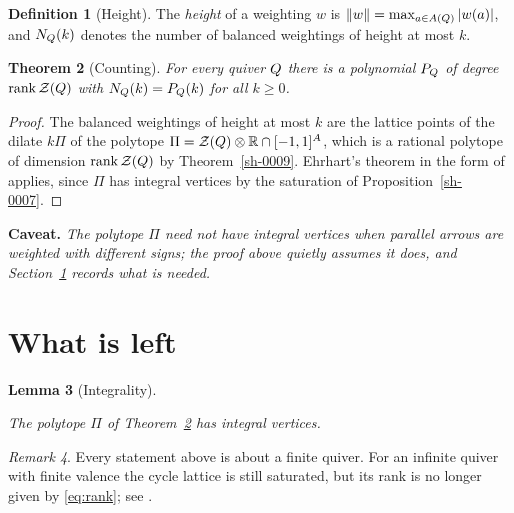\documentclass[11pt]{amsart}
\providecommand{\uses}[1]{}
\providecommand{\incomplete}[1]{}
\theoremstyle{plain}
\newtheorem{theorem}{Theorem}[section]
\newtheorem{lemma}[theorem]{Lemma}
\theoremstyle{definition}
\newtheorem{definition}[theorem]{Definition}
\theoremstyle{remark}
\newtheorem{remark}[theorem]{Remark}
\newenvironment{caveat}{\par\medskip\noindent\textbf{Caveat.}\begingroup\itshape}{\endgroup\par\medskip}
\begin{document}
\begin{definition}[Height]\label{sh-000B}
The \emph{height} of a weighting $w$ is $\|w\| = \max_{a \in A(Q)} |w(a)|$, and $N_{Q}(k)$ denotes the number of balanced weightings of height at most $k$.
\end{definition}


\begin{theorem}[Counting]\label{sh-000C}
For every quiver $Q$ there is a polynomial $P_{Q}$ of degree $\operatorname{rank} \mathcal{Z}(Q)$ with $N_{Q}(k) = P_{Q}(k)$ for all $k \geq 0$.
\end{theorem}
\begin{proof}
\uses{sh-0009, sh-0007}
The balanced weightings of height at most $k$ are the lattice points of the dilate $k \Pi$ of the polytope $\Pi = \mathcal{Z}(Q) \otimes \mathbb{R} \cap [-1,1]^{A}$, which is a rational polytope of dimension $\operatorname{rank} \mathcal{Z}(Q)$ by Theorem~\ref{sh-0009}. Ehrhart's theorem in the form of \cite[Theorem 3.2]{Bellamy19} applies, since $\Pi$ has integral vertices by the saturation of Proposition~\ref{sh-0007}.
\end{proof}


\begin{caveat}\label{sh-000D}
The polytope $\Pi$ need not have integral vertices when parallel arrows are weighted with different signs; the proof above quietly assumes it does, and Section~\ref{sh-0400} records what is needed.
\end{caveat}


\section{What is left}\label{sh-0400}

\begin{lemma}[Integrality]\label{sh-000E}
\incomplete{The vertex description of $\Pi$ is not written down, so integrality is unproved.}
The polytope $\Pi$ of Theorem~\ref{sh-000C} has integral vertices.
\end{lemma}


\begin{remark}\label{sh-000F}
Every statement above is about a finite quiver. For an infinite quiver with finite valence the cycle lattice is still saturated, but its rank is no longer given by \eqref{eq:rank}; see \cite{Cortez07}.
\end{remark}




\end{document}
